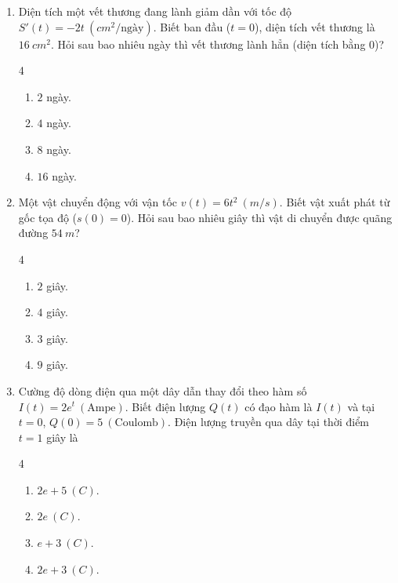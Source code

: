 \documentclass[12pt]{article}
\begin{document}
\begin{enumerate}[label=\textbf{Câu \arabic*.}]
		\item Diện tích một vết thương đang lành giảm dần với tốc độ $S'(t) = -2t \ (cm^2/\text{ngày})$. Biết ban đầu ($t = 0$), diện tích vết thương là $16 \ cm^2$. Hỏi sau bao nhiêu ngày thì vết thương lành hẳn (diện tích bằng $0$)?
		\begin{multicols}{4}
			\begin{enumerate}[label=\textbf{\Alph*.}]
				\item $2$ ngày.
				\item $4$ ngày.
				\item $8$ ngày.
				\item $16$ ngày.
			\end{enumerate}
		\end{multicols}
		
		\item Một vật chuyển động với vận tốc $v(t) = 6t^2 \ (m/s)$. Biết vật xuất phát từ gốc tọa độ ($s(0)=0$). Hỏi sau bao nhiêu giây thì vật di chuyển được quãng đường $54 \ m$?
		\begin{multicols}{4}
			\begin{enumerate}[label=\textbf{\Alph*.}]
				\item $2$ giây.
				\item $4$ giây.
				\item $3$ giây.
				\item $9$ giây.
			\end{enumerate}
		\end{multicols}
		
		\item Cường độ dòng điện qua một dây dẫn thay đổi theo hàm số $I(t) = 2e^t \ (\text{Ampe})$. Biết điện lượng $Q(t)$ có đạo hàm là $I(t)$ và tại $t = 0$, $Q(0) = 5 \ (\text{Coulomb})$. Điện lượng truyền qua dây tại thời điểm $t = 1$ giây là
		\begin{multicols}{4}
			\begin{enumerate}[label=\textbf{\Alph*.}]
				\item $2e + 5 \ (C)$.
				\item $2e \ (C)$.
				\item $e + 3 \ (C)$.
				\item $2e + 3 \ (C)$.
			\end{enumerate}
		\end{multicols}
		

\end{enumerate}
\end{document}
